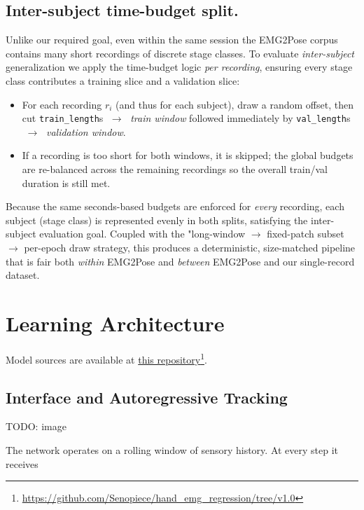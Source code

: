 \subsection{Inter-subject time-budget split.}
Unlike our required goal, even within the same session the EMG2Pose corpus contains many short recordings of discrete stage classes.
To evaluate \emph{inter-subject} generalization we apply the time-budget logic \emph{per recording}, ensuring every stage class contributes
a training slice and a validation slice:

\begin{itemize}
  \item For each recording $r_{i}$ (and thus for each subject), draw  
        a random offset, then cut
        \texttt{train\_length}s $\;\to\;$ \emph{train window}
        followed immediately by
        \texttt{val\_length}s $\;\to\;$ \emph{validation window}.
  \item If a recording is too short for both windows, it is skipped; the global
        budgets are re-balanced across the remaining recordings so the overall
        train/val duration is still met.
\end{itemize}

Because the same seconds-based budgets are enforced for \emph{every} recording,
each subject (stage class) is represented evenly in both splits, satisfying the
inter-subject evaluation goal. Coupled with the "long-window $\to$ fixed-patch
subset $\to$ per-epoch draw strategy, this produces a deterministic,
size-matched pipeline that is fair both \emph{within} EMG2Pose and \emph{between}
EMG2Pose and our single-record dataset.

\section{Learning Architecture}

Model sources are available at \href{https://github.com/Senopiece/hand_emg_regression/tree/v1.0}{this repository}\footnote{\url{https://github.com/Senopiece/hand_emg_regression/tree/v1.0}}.

\subsection{Interface and Autoregressive Tracking}

TODO: image

The network operates on a rolling window of sensory history.
At every step it receives

